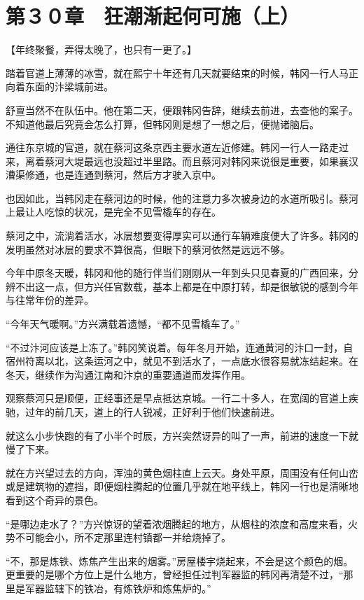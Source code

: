 \section{第３０章　狂潮渐起何可施（上）}

【年终聚餐，弄得太晚了，也只有一更了。】

踏着官道上薄薄的冰雪，就在熙宁十年还有几天就要结束的时候，韩冈一行人马正向着东面的汴梁城前进。

舒亶当然不在队伍中。他在第二天，便跟韩冈告辞，继续去前进，去查他的案子。不知道他最后究竟会怎么打算，但韩冈则是想了一想之后，便抛诸脑后。

通往东京城的官道，就在蔡河这条京西主要水道左近修建。韩冈一行人一路走过来，离着蔡河大堤最远也没超过半里路。而且蔡河对韩冈来说很是重要，如果襄汉漕渠修通，也是连通到蔡河，然后方才驶入京中。

也因如此，当韩冈走在蔡河边的时候，他的注意力多次被身边的水道所吸引。蔡河上最让人吃惊的状况，是完全不见雪橇车的存在。

蔡河之中，流淌着活水，冰层想要变得厚实可以通行车辆难度便大了许多。韩冈的发明虽然对冰层的要求不算很高，但眼下的蔡河依然是远远不够。

今年中原冬天暖，韩冈和他的随行伴当们刚刚从一年到头只见春夏的广西回来，分辨不出这一点，但方兴任官数载，基本上都是在中原打转，却是很敏锐的感到今年与往常年份的差异。

“今年天气暖啊。”方兴满载着遗憾，“都不见雪橇车了。”

“不过汴河应该是上冻了。”韩冈笑说着。每年冬月开始，连通黄河的汴口一封，自宿州符离以北，这条运河之中，就见不到活水了，一点底水很容易就冻结起来。在冬天，继续作为沟通江南和汴京的重要通道而发挥作用。

观察蔡河只是顺便，正经事还是早点抵达京城。一行二十多人，在宽阔的官道上疾驰，过年的前几天，道上的行人锐减，正好利于他们快速前进。

就这么小步快跑的有了小半个时辰，方兴突然讶异的叫了一声，前进的速度一下就慢了下来。

就在方兴望过去的方向，浑浊的黄色烟柱直上云天。身处平原，周围没有任何山峦或是建筑物的遮挡，即便烟柱腾起的位置几乎就在地平线上，韩冈一行也是清晰地看到这个奇异的景色。

“是哪边走水了？”方兴惊讶的望着浓烟腾起的地方，从烟柱的浓度和高度来看，火势不可能会小，所不定那里连村镇都一并给烧掉了。

“不，那是炼铁、炼焦产生出来的烟雾。”房屋楼宇烧起来，不会是这个颜色的烟。更重要的是哪个方位上是什么地方，曾经担任过判军器监的韩冈再清楚不过，“那里是军器监辖下的铁冶，有炼铁炉和炼焦炉的。”


